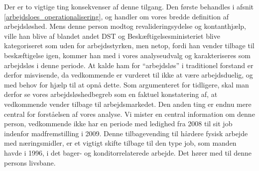 Der er to vigtige ting konsekvenser af denne tilgang. Den første behandles i afsnit \ref{arbejdsloes_operationalisering}, og handler om vores bredde definition af arbejdsløshed. Mens denne person modtog revalideringsydelse og kontanthjælp, ville han blive af blandet andet DST og Beskæftigelsesministeriet blive kategoriseret som uden for arbejdsstyrken, men netop, fordi han vender tilbage til beskæftigelse igen, kommer han med i vores analyseudvalg og karakteriseres som arbejdsløs i denne periode. At kalde ham for “arbejdsløs” i traditionel forstand er derfor misvisende, da vedkommende er vurderet til ikke at være arbejdsduelig, og med behov for hjælp til at opnå dette. Som argumenteret for tidligere, skal man derfor se vores arbejdsløshedbegreb som en faktuel konstatering af, at vedkommende vender tilbage til arbejdsmarkedet.
Den anden ting er endnu mere central for forståelsen af vores analyse. Vi mister en central information om denne person, vedkommende ikke har en periode med ledighed fra 2008 til sit job indenfor madfremstilling i 2009. Denne tilbagevending til hårdere fysisk arbejde med næringsmidler, er et vigtigt skifte tilbage til den type job, som manden havde i 1996, i det bager- og konditorrelaterede arbejde. Det hører med til denne persons livsbane. %
%
